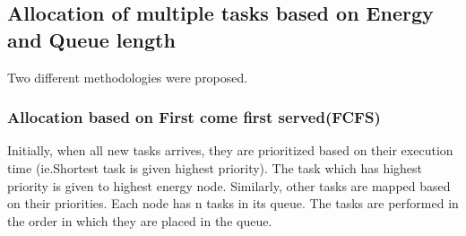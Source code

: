 \documentclass[conference]{IEEEtran}
\begin{document}
\subsection{Allocation of multiple tasks based on Energy and Queue length}
Two different methodologies were proposed.\\
% 

\subsubsection{Allocation based on First come first served(FCFS)}
Initially, when all new tasks arrives, they are prioritized based on their execution time (ie.Shortest task is given highest priority). The task which has highest priority is given to highest energy node. Similarly, other tasks are mapped based on their priorities. Each node has n tasks in its queue. The tasks are performed in the order in which they are placed in the queue. 
\end{document}
